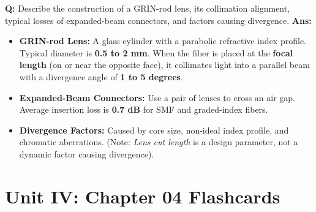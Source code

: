 \documentclass[10pt,a4paper,twocolumn]{article}
\begin{document}
\begin{tcolorbox}[
  colback=white,
  colframe=UnitColorThree,
  colbacktitle=gray!10!white,
  coltitle=black,
  fonttitle=\bfseries\sffamily\small,
  title={Unit III $\bullet$ Card 10: GRIN-rod Lenses \& Expanded-Beam Connectors},
  boxrule=1.2pt,
  arc=2mm,
  outer arc=2mm,
  boxsep=1.5mm,
  top=1mm,
  bottom=1mm,
  left=1.5mm,
  right=1.5mm,
  before skip=2.5mm,
  after skip=2.5mm
]
\textbf{Q:} Describe the construction of a GRIN-rod lens, its collimation alignment, typical losses of expanded-beam connectors, and factors causing divergence.
\tcbline
\textbf{Ans:} \begin{itemize}
  \item   \textbf{GRIN-rod Lens:} A glass cylinder with a parabolic refractive index profile. Typical diameter is \textbf{0.5 to 2 mm}. When the fiber is placed at the \textbf{focal length} (on or near the opposite face), it collimates light into a parallel beam with a divergence angle of \textbf{1 to 5 degrees}.
  \item   \textbf{Expanded-Beam Connectors:} Use a pair of lenses to cross an air gap. Average insertion loss is \textbf{0.7 dB} for SMF and graded-index fibers.
  \item   \textbf{Divergence Factors:} Caused by core size, non-ideal index profile, and chromatic aberrations. (Note: \textit{Lens cut length} is a design parameter, not a dynamic factor causing divergence).
\end{itemize}
\end{tcolorbox}

\section*{Unit IV: Chapter 04 Flashcards}
\end{document}
